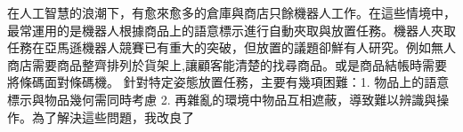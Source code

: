 \begin{abstractzh}
在人工智慧的浪潮下，有愈來愈多的倉庫與商店只餘機器人工作。在這些情境中，最常運用的是機器人根據商品上的語意標示進行自動夾取與放置任務。機器人夾取任務在亞馬遜機器人競賽已有重大的突破，但放置的議題卻鮮有人研究。例如無人商店需要商品整齊排列於貨架上,讓顧客能清楚的找尋商品。或是商品結帳時需要將條碼面對條碼機。
針對特定姿態放置任務，主要有幾項困難：1. 物品上的語意標示與物品幾何需同時考慮 2. 再雜亂的環境中物品互相遮蔽，導致難以辨識與操作。為了解決這些問題，我改良了~\cite{peterthesis}

\end{abstractzh}
